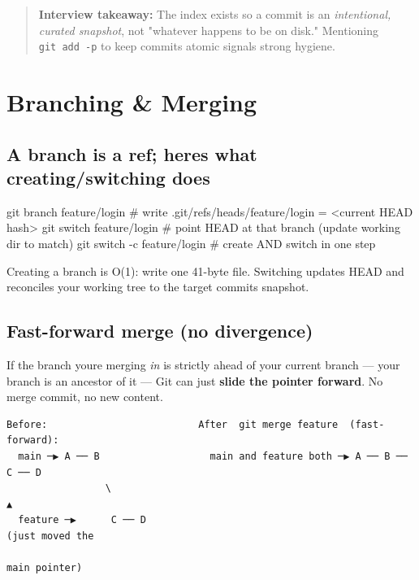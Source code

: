\documentclass[11pt]{article}
\newenvironment{Shaded}{\begin{snugshade}}{\end{snugshade}}
\newcommand{\AttributeTok}[1]{\textcolor[rgb]{0.16,0.50,0.73}{#1}}
\newcommand{\CommentTok}[1]{\textcolor[rgb]{0.48,0.49,0.49}{#1}}
\newcommand{\FunctionTok}[1]{\textcolor[rgb]{0.56,0.27,0.68}{#1}}
\newcommand{\NormalTok}[1]{\textcolor[rgb]{0.81,0.81,0.76}{#1}}
\begin{document}
\begin{quote}
\textbf{Interview takeaway:} The index exists so a commit is an \emph{intentional, curated snapshot}, not "whatever happens to be on disk." Mentioning \texttt{git\ add\ -p} to keep commits atomic signals strong hygiene.
\end{quote}

\section{Branching \& Merging}\label{branching--merging}

\subsection{A branch is a ref; here\textquotesingle s what creating/switching does}\label{a-branch-is-a-ref-heres-what-creatingswitching-does}


\begin{Shaded}
\begin{Highlighting}[]
\FunctionTok{git}\NormalTok{ branch feature/login        }\CommentTok{\# write .git/refs/heads/feature/login = \textless{}current HEAD hash\textgreater{}}
\FunctionTok{git}\NormalTok{ switch feature/login        }\CommentTok{\# point HEAD at that branch (update working dir to match)}
\FunctionTok{git}\NormalTok{ switch }\AttributeTok{{-}c}\NormalTok{ feature/login     }\CommentTok{\# create AND switch in one step}
\end{Highlighting}
\end{Shaded}

Creating a branch is O(1): write one 41-byte file. Switching updates HEAD and reconciles your working tree to the target commit\textquotesingle s snapshot.

\subsection{Fast-forward merge (no divergence)}\label{fast-forward-merge-no-divergence}

If the branch you\textquotesingle re merging \emph{in} is strictly ahead of your current branch --- your branch is an ancestor of it --- Git can just \textbf{slide the pointer forward}. No merge commit, no new content.

\setcodelang{}

\begin{verbatim}
Before:                          After  git merge feature  (fast-forward):
  main ─▶ A ── B                   main and feature both ─▶ A ── B ── C ── D
                 \                                                         ▲
  feature ─▶      C ── D                                          (just moved the
                                                                   main pointer)
\end{verbatim}
\end{document}
